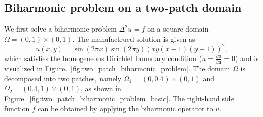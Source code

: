 \documentclass[preprint,12pt]{elsarticle}
\theoremstyle{remark}
\begin{document}
\subsection{Biharmonic problem on a two-patch domain} \label{sec:two_patch}

We first solve a biharmonic problem $\Delta^2{}u=f$ on a square domain $\Omega={(0,1)\times(0,1)}$. The manufactrued solution is given as
\begin{equation}
    u(x,y)=\sin(2\pi{x})\sin(2\pi{y})(xy(x-1)(y-1))^2,
\end{equation}
which satisfies the homogeneous Dirichlet boundary condition ($u=\frac{\partial{u}}{\partial{\mathbf{n}}}=0$) and is visualized in Figure.~\ref{fig:two_patch_biharmonic_problem}. The domain $\Omega$ is decomposed into two patches, namely $\Omega_1={(0,0.4)\times(0,1)}$ and $\Omega_2={(0.4,1)\times(0,1)}$, as shown in Figure.~\ref{fig:two_patch_biharmonic_problem_basic}. The right-hand side function $f$ can be obtained by applying the biharmonic operator to $u$.
\end{document}
